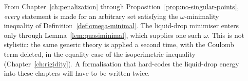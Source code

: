 \begin{remark}\label{rem:generic-discipline}
From Chapter~\ref{ch:penalization} through
Proposition~\ref{prop:no-singular-points}, \emph{every} statement is made for
an arbitrary set satisfying the $\omega$-minimality inequality of
Definition~\ref{def:omega-minimal}.  The liquid-drop minimiser enters only
through Lemma~\ref{lem:quasiminimal}, which supplies one such $\omega$.  This
is not stylistic: the same generic theory is applied a second time, with the
Coulomb term deleted, in the equality case of the isoperimetric inequality
(Chapter~\ref{ch:rigidity}).  A formalisation that hard-codes the liquid-drop
energy into these chapters will have to be written twice.
\end{remark}

